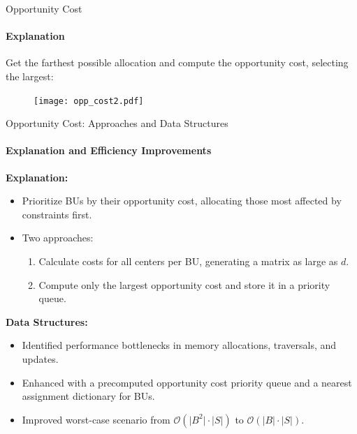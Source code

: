 \documentclass{beamer}
\begin{document}
\begin{frame}{Opportunity Cost}
    \framesubtitle{Explanation}
    Get the farthest possible allocation and compute the opportunity cost, selecting the largest:
    \begin{figure}
        \centering
        \texttt{[image: opp\_cost2.pdf]}
    \end{figure}
\end{frame}
\begin{frame}{Opportunity Cost: Approaches and Data Structures}
    \framesubtitle{Explanation and Efficiency Improvements}

    \textbf{Explanation:}
    \begin{itemize}
        \item Prioritize BUs by their opportunity cost, allocating those most affected by constraints first.
        \item Two approaches:
        \begin{enumerate}
            \item Calculate costs for all centers per BU, generating a matrix as large as $d$.
            \item Compute only the largest opportunity cost and store it in a priority queue.
        \end{enumerate}
    \end{itemize}
    
    \textbf{Data Structures:}
    \begin{itemize}
        \item Identified performance bottlenecks in memory allocations, traversals, and updates.
        \item Enhanced with a precomputed opportunity cost priority queue and a nearest assignment dictionary for BUs.
        \item Improved worst-case scenario from $\mathcal{O}(\lvert B^2\rvert \cdot \lvert S \rvert)$ to $\mathcal{O}(\lvert B \rvert \cdot \lvert S \rvert)$.
    \end{itemize}
\end{frame}
\end{document}
